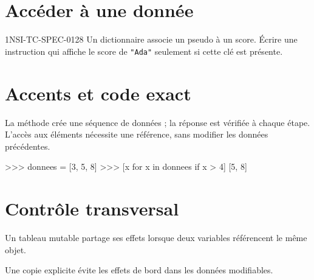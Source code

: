 \documentclass{gabarits/nexus-manuel}
\begin{document}
\section{Accéder à une donnée}
\begin{exercice}{1NSI-TC-SPEC-01}{2}{8}
Un dictionnaire associe un pseudo à un score. Écrire une instruction qui affiche le score de
\lstinline{"Ada"} seulement si cette clé est présente.
\end{exercice}
\clearpage

\section*{Accents et code exact}
La méthode crée une séquence de données ; la réponse est vérifiée à chaque étape.
L'accès aux éléments nécessite une référence, sans modifier les données précédentes.
\begin{console}
>>> donnees = [3, 5, 8]
>>> [x for x in donnees if x > 4]
[5, 8]
\end{console}
\clearpage

\section*{Contrôle transversal}
\begin{nxthm}[T1]
Un tableau mutable partage ses effets lorsque deux variables référencent le même objet.
\end{nxthm}
\begin{nxprop}[P1]
Une copie explicite évite les effets de bord dans les données modifiables.
\end{nxprop}
\end{document}
